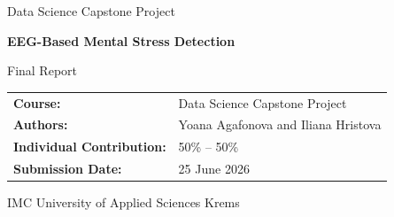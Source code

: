 \documentclass[12pt,a4paper]{article}
\newcommand{\projecttitle}{EEG-Based Mental Stress Detection}
\newcommand{\coursename}{Data Science Capstone Project}
\newcommand{\submissiondate}{25 June 2026}
\newcommand{\authors}{Yoana Agafonova and Iliana Hristova}
\begin{document}
	
	\begin{titlepage}
		\centering
		
		{\Large \coursename \par}
		
		\vspace{2cm}
		
		{\Huge \textbf{\projecttitle} \par}
		
		\vspace{1.5cm}
		
		{\Large Final Report \par}
		
		\vspace{2cm}
		
		\begin{tabular}{ll}
			\textbf{Course:} & \coursename \\
			\textbf{Authors:} & \authors \\
			\textbf{Individual Contribution:} & 50\% -- 50\% \\
			\textbf{Submission Date:} & \submissiondate \\
		\end{tabular}
		
		\vfill
		
		{\large IMC University of Applied Sciences Krems \par}
		
	\end{titlepage}
	
	
\end{document}

